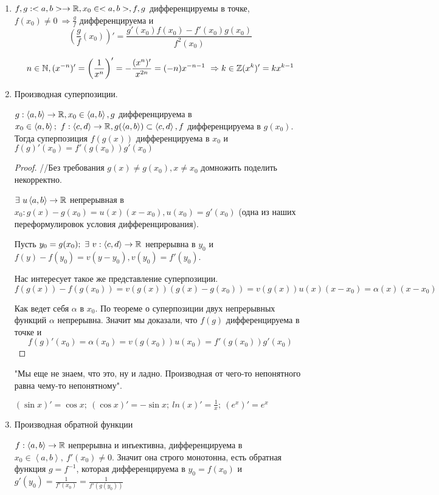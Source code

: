 \documentclass[12pt]{report}
\begin{document}
\begin{enumerate}
\item $f, g: <a, b> \to \mathbb{R}, x_0 \in <a, b>, f, g$ дифференцируемы в точке, $f(x_0) \neq 0 ~\Rightarrow \frac{g}{f}$ дифференцируема и
$$\left(\frac{g}{f}(x_0)\right)' = \frac{g'(x_0)f(x_0) - f'(x_0)g(x_0)}{f^2(x_0)}$$

\begin{cor}
$$n \in \mathbb{N}, (x^{-n})' = \left(\frac{1}{x^n}\right)' = -\frac{(x^n)'}{x^{2n}} = (-n)x^{-n - 1} ~\Rightarrow k \in \mathbb{Z} (x^k)' = kx^{k - 1}$$
\end{cor}

\item Производная суперпозиции.

$g: \left<a, b\right> \to \mathbb{R}, x_0 \in \left<a, b\right>, g$ дифференцируема в $x_0 \in\left<a, b\right>; ~f: \left<c, d\right> \to \mathbb{R}, g(\left<a, b\right>) \subset \left<c, d\right>, f$ дифференцируема в $g(x_0)$. Тогда суперпозиция $f(g(x))$ дифференцируема в $x_0$ и $f(g)'(x_0) = f'(g(x_0))g'(x_0)$

\begin{proof}
//Без требования $g(x) \neq g(x_0), x \neq x_0$ домножить поделить некорректно.

$\exists ~u \left<a, b\right> \to \mathbb{R}$ непрерывная в $x_0: g(x) - g(x_0) = u(x)(x - x_0), u(x_0) = g'(x_0)$ (одна из наших переформулировок условия дифференцирования). 

Пусть $y_0 = g(x_0); ~\exists ~v: \left<c, d\right> \to \mathbb{R}$ непрерывна в $y_0$ и $f(y) - f(y_0) = v(y - y_0), v(y_0) = f'(y_0)$.

Нас интересует такое же представление суперпозиции.
$$f(g(x)) - f(g(x_0)) = v(g(x))(g(x) - g(x_0)) = v(g(x))u(x)(x - x_0) = \alpha(x)(x - x_0)$$

Как ведет себя $\alpha$ в $x_0$. По теореме о суперпозиции двух непрерывных функций $\alpha$ непрерывна. Значит мы доказали, что $f(g)$ дифференцируема в точке и 
$$f(g)'(x_0) = \alpha (x_0) = v(g(x_0))u(x_0) = f'(g(x_0))g'(x_0)$$
\end{proof}

\begin{note}
"Мы еще не знаем, что это, ну и ладно. Производная от чего-то непонятного равна чему-то непонятному".

$(\sin{x})' = \cos{x}; ~(\cos{x})' = -\sin{x}; ~ln(x)' = \frac{1}{x}; ~(e^x)' = e^x$
\end{note}

\item Производная обратной функции

$f: \left<a, b\right> \to \mathbb{R}$ непрерывна и инъективна, дифференцируема в $x_0 \in \left<a, b\right>, ~f'(x_0) \neq 0$. Значит она строго монотонна, есть обратная функция $g = f^{-1}$, которая дифференцируема в $y_0 = f(x_0)$ и $g'(y_0) = \frac{1}{f'(x_0)} = \frac{1}{f'(g(y_0))}$


\end{enumerate}
\end{document}
